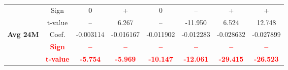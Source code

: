 \documentclass[11pt,english,a4paper,hidelinks]{book}
\begin{document}
\begin{table}[H]
\begin{tabular}{lccccccc}
            & Sign    & 0         & +         & 0         & –         & +         & +         \\
            & t-value & --        & 6.267     & --        & -11.950   & 6.524     & 12.748    \\
        \cmidrule{1-8}
        \multirow{3}{*}{\textbf{Avg 24M}}
            & Coef.   & -0.003114 & -0.016167 & -0.011902 & -0.012283 & -0.028632 & -0.027899 \\
            & \textbf{\textcolor{red}{Sign}}
                     & \textbf{\textcolor{red}{–}}
                     & \textbf{\textcolor{red}{–}}
                     & \textbf{\textcolor{red}{–}}
                     & \textbf{\textcolor{red}{–}}
                     & \textbf{\textcolor{red}{–}}
                     & \textbf{\textcolor{red}{–}} \\
            & \textbf{\textcolor{red}{t-value}}
                     & \textbf{\textcolor{red}{-5.754}}
                     & \textbf{\textcolor{red}{-5.969}}
                     & \textbf{\textcolor{red}{-10.147}}
                     & \textbf{\textcolor{red}{-12.061}}
                     & \textbf{\textcolor{red}{-29.415}}
                     & \textbf{\textcolor{red}{-26.523}} \\
        
        \bottomrule
    \end{tabular}
    \label{tab:north_america_value_consistency}
\end{table}
\end{document}
